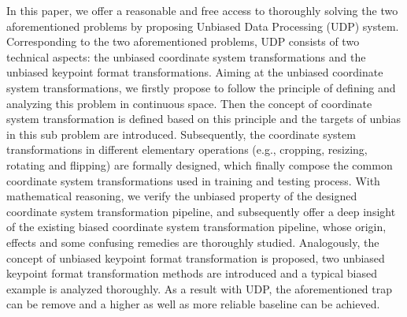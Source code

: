 \documentclass[10pt,journal,compsoc]{IEEEtran}
\begin{document}
In this paper, we offer a reasonable and free access to thoroughly solving the two aforementioned problems by proposing Unbiased Data Processing (UDP) system. Corresponding to the two aforementioned problems, UDP consists of two technical aspects: the unbiased coordinate system transformations and the  unbiased keypoint format transformations. Aiming at the unbiased coordinate system transformations, we firstly propose to follow the principle of defining and analyzing this problem in continuous space. Then the concept of coordinate system transformation is defined based on this principle and the targets of unbias in this sub problem are introduced. Subsequently, the coordinate system transformations in different elementary operations (e.g., cropping, resizing, rotating and flipping) are formally designed, which finally compose the common coordinate system transformations used in training and testing process. With mathematical reasoning, we verify the unbiased property of the designed coordinate system transformation pipeline, and subsequently offer a deep insight of the existing biased coordinate system transformation pipeline, whose origin, effects and some confusing remedies are thoroughly studied. Analogously, the concept of unbiased keypoint format transformation is proposed, two unbiased keypoint format transformation methods are introduced and a typical biased example is analyzed thoroughly. As a result with UDP, the aforementioned trap can be remove and a higher as well as more reliable baseline can be achieved.
\end{document}
